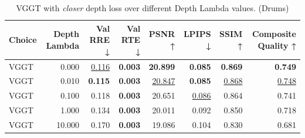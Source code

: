 \begin{table}[H]
\caption{\ifdefined\customcaption \customcaption \else VGGT with \textit{closer} depth loss over different Depth Lambda values. (Drums) \fi}
\label{tab:05_depth_lambda_drums}
\centering
\scriptsize
\begin{tabular}{lrrrrrrr}
\toprule
Choice & Depth Lambda & Val RRE ↓ & Val RTE ↓ & PSNR ↑ & LPIPS ↓ & SSIM ↑ & Composite Quality ↑ \\
\midrule
VGGT & 0.000 & \underline{0.116} & \textbf{0.003} & \textbf{20.899} & \textbf{0.085} & \textbf{0.869} & \textbf{0.749} \\
VGGT & 0.010 & \textbf{0.115} & \textbf{0.003} & \underline{20.847} & \textbf{0.085} & \underline{0.868} & \underline{0.748} \\
VGGT & 0.100 & 0.118 & \textbf{0.003} & 20.651 & \underline{0.086} & 0.864 & 0.741 \\
VGGT & 1.000 & 0.134 & \textbf{0.003} & 20.011 & 0.092 & 0.850 & 0.718 \\
VGGT & 10.000 & 0.170 & \textbf{0.003} & 19.086 & 0.104 & 0.830 & 0.681 \\
\bottomrule
\end{tabular}
\end{table}